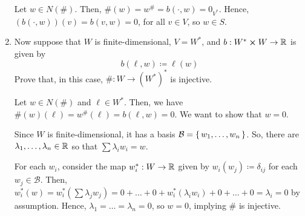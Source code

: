 \documentclass{article}
\begin{document}
\begin{problem}
\begin{enumerate}[label=(\alph*)]
\begin{solution}
		      Let $w \in N(\#)$.
		      Then, $\#(w) = w^{\#} = b(\cdot, w) = 0_{V^*}$.
		      Hence, $(b(\cdot, w))(v) = b(v, w) = 0$, for all $v \in V$, so $w \in S$.
	      \end{solution}

	      \newpage
	\item Now suppose that $W$ is finite-dimensional, $V = W^*$, and $b : W^* \cross W \to \mathbb{R}$ is given by
	      \[
		      b(\ell, w) \coloneq \ell(w)
	      \]
	      Prove that, in this case, $\# : W \to (W^*)^*$ is injective.
	      \begin{solution}
		      Let $w \in N(\#)$ and $\ell \in W^*$.
		      Then, we have $\#(w)(\ell) = w^{\#}(\ell) = b(\ell, w) = 0$.
		      We want to show that $w = 0$.

		      Since $W$ is finite-dimensional, it has a basis $\mathcal{B} = \set{w_1, \dots, w_n}$.
		      So, there are $\lambda_1, \dots, \lambda_n \in \mathbb{R}$ so that $\sum \lambda_i w_i = w$.

		      For each $w_i$, consider the map $w_i^* : W \to \mathbb{R}$ given by $w_i(w_j) \coloneq \delta_{ij}$ for each $w_j \in \mathcal{B}$.
		      Then, $w_i^*(w) = w_i^*(\sum \lambda_j w_j) = 0 + \dots + 0 + w_{i}^*(\lambda_i w_i) + 0 + \dots + 0 = \lambda_i = 0$ by assumption.
		      Hence, $\lambda_1 = \dots = \lambda_n = 0$, so $w = 0$, implying $\#$ is injective.
	      \end{solution}
\end{enumerate}
\end{problem}
\end{document}

